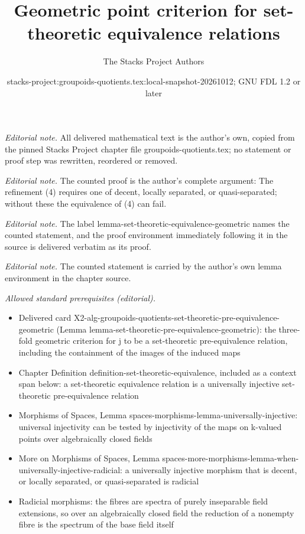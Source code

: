 \documentclass[10pt,a4paper]{amsart}
\title{Geometric point criterion for set-theoretic equivalence relations}
\author{The Stacks Project Authors}
\date{stacks-project:groupoids-quotients.tex:local-snapshot-20261012; GNU FDL 1.2 or later}
\theoremstyle{plain}
\theoremstyle{definition}
\theoremstyle{remark}
\numberwithin{equation}{subsection}
\begin{document}
\maketitle
\noindent\textit{Editorial note.} All delivered mathematical text is the author's own, copied from the pinned Stacks Project chapter file groupoids-quotients.tex; no statement or proof step was rewritten, reordered or removed.\par\medskip
\noindent\textit{Editorial note.} The counted proof is the author's complete argument: The refinement (4) requires one of decent, locally separated, or quasi-separated; without these the equivalence of (4) can fail.\par\medskip
\noindent\textit{Editorial note.} The label lemma-set-theoretic-equivalence-geometric names the counted statement, and the proof environment immediately following it in the source is delivered verbatim as its proof.\par\medskip
\noindent\textit{Editorial note.} The counted statement is carried by the author's own lemma environment in the chapter source.\par\medskip
\noindent\textit{Allowed standard prerequisites (editorial).}\begin{itemize}
\item Delivered card X2-alg-groupoids-quotients-set-theoretic-pre-equivalence-geometric (Lemma lemma-set-theoretic-pre-equivalence-geometric): the three-fold geometric criterion for j to be a set-theoretic pre-equivalence relation, including the containment of the images of the induced maps
\item Chapter Definition definition-set-theoretic-equivalence, included as a context span below: a set-theoretic equivalence relation is a universally injective set-theoretic pre-equivalence relation
\item Morphisms of Spaces, Lemma spaces-morphisms-lemma-universally-injective: universal injectivity can be tested by injectivity of the maps on k-valued points over algebraically closed fields
\item More on Morphisms of Spaces, Lemma spaces-more-morphisms-lemma-when-universally-injective-radicial: a universally injective morphism that is decent, or locally separated, or quasi-separated is radicial
\item Radicial morphisms: the fibres are spectra of purely inseparable field extensions, so over an algebraically closed field the reduction of a nonempty fibre is the spectrum of the base field itself
\end{itemize}\medskip
\end{document}
